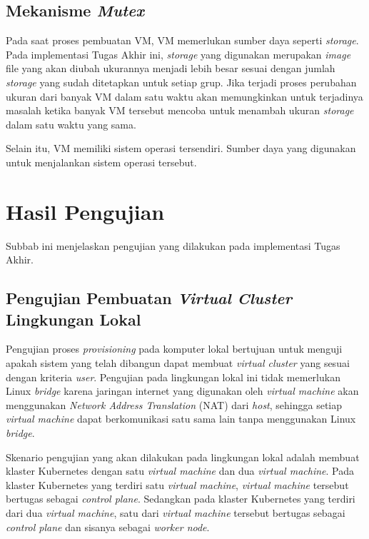 \subsection{Mekanisme \emph{Mutex}}

Pada saat proses pembuatan VM, VM memerlukan sumber daya seperti \emph{storage}. Pada
implementasi Tugas Akhir ini, \emph{storage} yang digunakan merupakan \emph{image} file yang
akan diubah ukurannya menjadi lebih besar sesuai dengan jumlah \emph{storage} yang sudah
ditetapkan untuk setiap grup. Jika terjadi proses perubahan ukuran dari banyak
VM dalam satu waktu akan memungkinkan untuk terjadinya masalah ketika banyak VM tersebut
mencoba untuk menambah ukuran \emph{storage} dalam satu waktu yang sama.

Selain itu, VM memiliki sistem operasi tersendiri. Sumber daya yang digunakan
untuk menjalankan sistem operasi tersebut.

\section{Hasil Pengujian}
\label{sec:hasil-pengujian}

Subbab ini menjelaskan pengujian yang dilakukan pada
implementasi Tugas Akhir.

\subsection{Pengujian Pembuatan \emph{Virtual Cluster} Lingkungan Lokal}
\label{subsec:pengujian-pembuatan-vc}

Pengujian proses \emph{provisioning} pada komputer lokal bertujuan untuk
menguji apakah sistem yang telah dibangun dapat membuat \emph{virtual cluster}
yang sesuai dengan kriteria \emph{user}. Pengujian pada lingkungan lokal ini
tidak memerlukan Linux \emph{bridge} karena jaringan internet yang digunakan
oleh \emph{virtual machine} akan menggunakan \emph{Network Address Translation} (NAT)
dari \emph{host}, sehingga setiap \emph{virtual machine} dapat berkomunikasi satu sama
lain tanpa menggunakan Linux \emph{bridge}.

Skenario pengujian yang akan dilakukan pada lingkungan lokal adalah
membuat klaster Kubernetes dengan satu \emph{virtual machine} dan dua \emph{virtual machine}.
Pada klaster Kubernetes yang terdiri satu \emph{virtual machine}, \emph{virtual machine}
tersebut bertugas sebagai \emph{control plane}. Sedangkan pada klaster Kubernetes yang terdiri
dari dua \emph{virtual machine}, satu dari \emph{virtual machine} tersebut bertugas sebagai
\emph{control plane} dan sisanya sebagai \emph{worker node}.

